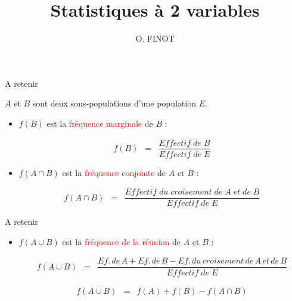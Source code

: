 \documentclass[xcolor={dvipsnames}]{beamer}
\title{Statistiques à 2 variables}
\author{O. FINOT}\institute{Lycée S$^t$ Vincent}
\begin{document}
\begin{frame}
  \titlepage 
\end{frame}

\begin{frame}{A retenir}
	
	$A$ et $B$ sont deux sous-populations d'une population $E$.
	
	\begin{itemize}
		\item $ f(B) $ est la \textcolor{red}{fréquence marginale} de $B$ :
					
			\begin{eqnarray*}
				f(B) &=& \dfrac{Effectif\; de\; B }{Effectif\; de\; E}
			\end{eqnarray*}\pause
					
		\item $f(A \cap B)$ est la \textcolor{red}{fréquence conjointe} de $A$ et $B$ :
					
			\begin{eqnarray*}
				f(A \cap B) &=& \dfrac{Effectif\; du\; croisement \; de\;A\; et\; de\; B }{Effectif\; de\; E}
			\end{eqnarray*}
		

			
	\end{itemize}
\end{frame}



\begin{frame}{A retenir}

\begin{itemize}
	
	
	\item $f(A \cup B)$ est la \textcolor{red}{fréquence de la réunion} de $A$ et $B$ :
	
	\begin{eqnarray*}
		f(A \cup B) &=& \dfrac{Ef.\, de\, A + Ef.\, de\, B  - Ef.\, du\, croisement \, de\,A\, et\, de\, B}{Effectif\; de\; E}
	\end{eqnarray*}
	
	\begin{eqnarray*}
		f(A \cup B) &=& f(A) + f(B) - f(A \cap B)
	\end{eqnarray*}

	
\end{itemize}
\end{frame}
\end{document}
